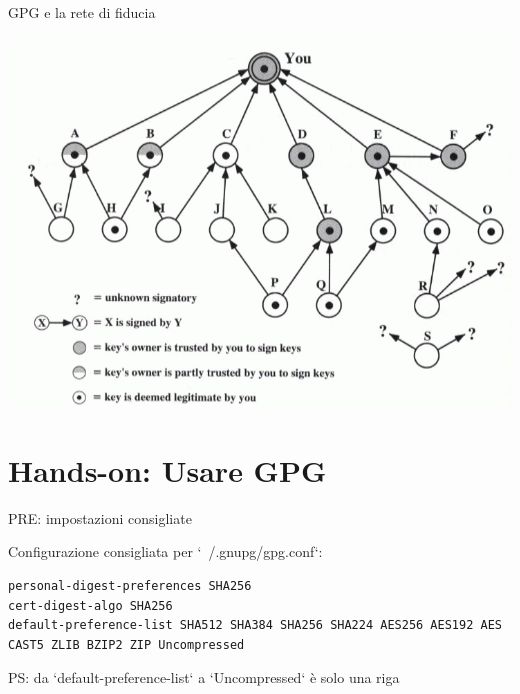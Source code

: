 \documentclass[10pt]{beamer}
\begin{document}
\begin{frame}{GPG e la rete di fiducia}

\includegraphics[scale=0.4]{pgp_web}

\end{frame}

\section{Hands-on: Usare GPG}

\begin{frame}[fragile]{PRE: impostazioni consigliate}

Configurazione consigliata per `~/.gnupg/gpg.conf`:

\begin{lstlisting}
personal-digest-preferences SHA256
cert-digest-algo SHA256
default-preference-list SHA512 SHA384 SHA256 SHA224 AES256 AES192 AES CAST5 ZLIB BZIP2 ZIP Uncompressed
\end{lstlisting}

PS: da `default-preference-list` a `Uncompressed` è solo una riga

\end{frame}
\end{document}
